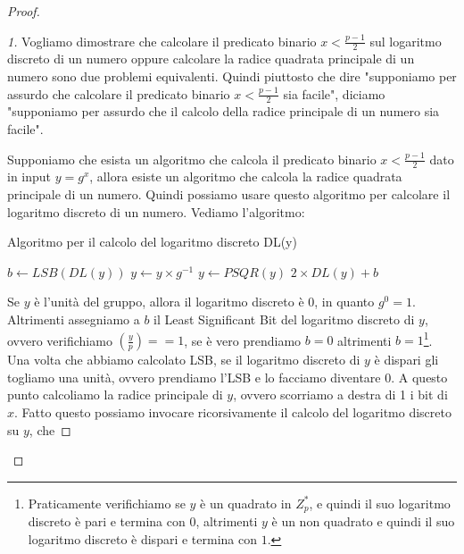 \begin{proof}
\begin{proof}[1]
Vogliamo dimostrare che calcolare il predicato binario $x < \frac{p-1}{2}$ sul logaritmo discreto di un numero oppure calcolare la radice quadrata principale di un numero sono due problemi equivalenti. Quindi piuttosto che dire "supponiamo per assurdo che calcolare il predicato binario $x < \frac{p-1}{2}$ sia facile", diciamo "supponiamo per assurdo che il calcolo della radice principale di un numero sia facile".

Supponiamo che esista un algoritmo che calcola il predicato binario  $x < \frac{p-1}{2}$ dato in input $y = g^x$, allora esiste un algoritmo che calcola la radice quadrata principale di un numero. Quindi possiamo usare questo algoritmo per calcolare il logaritmo discreto di un numero. 
Vediamo l'algoritmo:
\begin{algorithm}[H]
\caption{Algoritmo per il calcolo del logaritmo discreto DL(y)}\label{alg:cap}
\begin{algorithmic}
    \State {}   
\Else
    \State $b \gets LSB(DL(y))$
        \State $y \gets y \times g^{-1}$     
    \EndIf
    \State $y \gets PSQR(y)$    
    \State \Return $2 \times DL(y) + b$
\EndIf
\end{algorithmic}
\end{algorithm}

\noindent Se $y$ è l'unità del gruppo, allora il logaritmo discreto è $0$, in quanto $g^0=1$. Altrimenti assegniamo a $b$ il Least Significant Bit del logaritmo discreto di $y$, ovvero verifichiamo $\left( \frac{y}{p}\right) == 1$, se è vero prendiamo $b=0$ altrimenti $b=1$\footnote{Praticamente verifichiamo se $y$ è un quadrato in $Z_p^*$, e quindi il suo logaritmo discreto è pari e termina con $0$, altrimenti $y$ è un non quadrato e quindi il suo logaritmo discreto è dispari e termina con $1$.}. Una volta che abbiamo calcolato LSB, se il logaritmo discreto di $y$ è dispari gli togliamo una unità, ovvero prendiamo l'LSB e lo facciamo diventare $0$. A questo punto calcoliamo la radice principale di $y$, ovvero scorriamo a destra di 1 i bit di $x$. Fatto questo possiamo invocare ricorsivamente il calcolo del logaritmo discreto su $y$, che 
\end{proof}
    

\end{proof}
